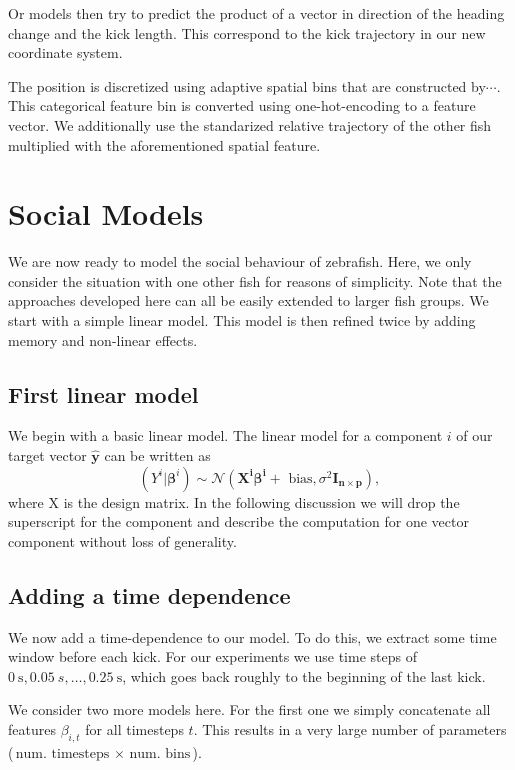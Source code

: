 \documentclass[nobib]{tufte-handout}
\begin{document}
Or models then try to predict the product of a vector in direction of the heading change and the kick length.
This correspond to the kick trajectory in our new coordinate system.

The position is discretized using adaptive spatial bins that are constructed by\(\cdots\).
This categorical feature bin is converted using one-hot-encoding to a feature vector.
We additionally use the standarized relative trajectory of the other fish multiplied with the aforementioned spatial feature.

\section{Social Models}
We are now ready to model the social behaviour of zebrafish.
Here, we only consider the situation with one other fish for reasons of simplicity.
Note that the approaches developed here can all be easily extended to larger fish groups.
We start with a simple linear model.
This model is then refined twice by adding memory and non-linear effects.

\subsection{First linear model}
We begin with a basic linear model.
The linear model for a component \(i\) of our target vector \(\hat{\bm{y}}\) can be written as
\begin{equation*}
 \left( Y^i | \bm{\beta}^{i} \right)  \sim \mathcal{N} \left( \bm{X^i} \bm{\beta^i} + \text{ bias}, \sigma^2 \bm{I_{n \times p}}  \right),
\end{equation*}
where X is the design matrix.
In the following discussion we will drop the superscript for the component and describe the computation for one vector component without loss of generality.

\subsection{Adding a time dependence}
We now add a time-dependence to our model.
To do this, we extract some time window before each kick.
For our experiments we use time steps of \(\SI{0}{\s}, \SI{0.05}{s}, \ldots, \SI{0.25}{\s}\), which goes back roughly to the beginning of the last kick.

We consider two more models here.
For the first one we simply concatenate all features \(\beta_{i, t}\) for all timesteps \(t\).
This results in a very large number of parameters (\(\text{num. timesteps } \times \text{ num. bins}\)).
\end{document}
